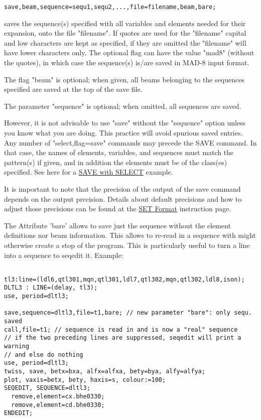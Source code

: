 \begin{itemize}
\begin{verbatim}
save,beam,sequence=sequ1,sequ2,...,file=filename,beam,bare;
\end{verbatim} saves the sequence(s) specified with all variables and elements needed for their expansion, onto the file "filename". If quotes are used for the "filename" capital and low characters are kept as specified, if they are omitted the "filename" will have lower characters only. The optional flag can have the value "mad8" (without the quotes), in which case the sequence(s) is/are saved in MAD-8 input format. 

 The flag "beam" is optional; when given, all beams belonging to the sequences specified are saved at the top of the save file. 

 The parameter "sequence" is optional; when omitted, all sequences are saved. 

  However, it is not advisable to use "save" without the "sequence" option unless you know what you are doing. This practice will avoid spurious saved entries.    Any number of "select,flag=save" commands may precede the SAVE command. In that case, the names of elements, variables, and sequences must match the pattern(s) if given, and in addition the elements must be of the class(es) specified. See here for a  \href{../Introduction/select.html#save_select}{SAVE with SELECT} example. 

 It is important to note that the precision of the output of the save command depends on the output precision. Details about default precisions and how to adjust those precisions can be found at the \href{../Introduction/set.html#Format}{SET Format} instruction page. 

 The Attribute 'bare' allows to save just the sequence without the element definitions nor beam information. This allows to re-read in a sequence with might otherwise create a stop of the program. This is particularly useful to turn a line into a sequence to seqedit it. Example: 
\begin{verbatim}

tl3:line=(ldl6,qtl301,mqn,qtl301,ldl7,qtl302,mqn,qtl302,ldl8,ison);
DLTL3 : LINE=(delay, tl3);
use, period=dltl3;

save,sequence=dltl3,file=t1,bare; // new parameter "bare": only sequ. saved
call,file=t1; // sequence is read in and is now a "real" sequence
// if the two preceding lines are suppressed, seqedit will print a warning
// and else do nothing
use, period=dltl3;
twiss, save, betx=bxa, alfx=alfxa, bety=bya, alfy=alfya;
plot, vaxis=betx, bety, haxis=s, colour:=100;
SEQEDIT, SEQUENCE=dltl3;
  remove,element=cx.bhe0330;
  remove,element=cd.bhe0330;
ENDEDIT;


\end{verbatim}
\end{itemize}
